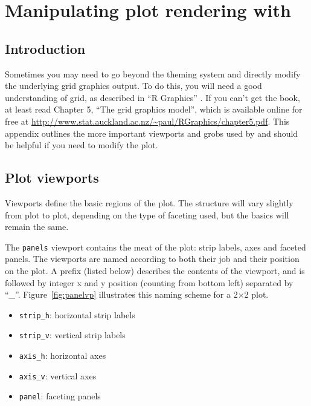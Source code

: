 

% 


\chapter{Manipulating plot rendering with }
\label{cha:grid}

\section{Introduction}

Sometimes you may need to go beyond the theming system and directly modify the underlying grid graphics output.  To do this, you will need a good understanding of grid, as described in ``R Graphics'' \citep{murrell:2005}.  If you can't get the book, at least read Chapter 5, ``The grid graphics model'', which is available online for free at  \url{http://www.stat.auckland.ac.nz/~paul/RGraphics/chapter5.pdf}.  This appendix outlines the more important viewports and grobs used by \ggplot and should be helpful if you need to modify the plot.

\section{Plot viewports}
\label{sec:plot-viewports}

Viewports define the basic regions of the plot.  The structure will vary slightly from plot to plot, depending on the type of faceting used, but the basics will remain the same. 

The {\tt panels} viewport contains the meat of the plot: strip labels, axes and faceted panels.  The viewports are named according to both their job and their position on the plot.  A prefix (listed below) describes the contents of the viewport, and is followed by integer x and y position (counting from bottom left) separated by ``\_''.  Figure~\ref{fig:panelvp} illustrates this naming scheme for a 2$\times$2 plot.

\begin{itemize}
  \item {\tt strip\_h}: horizontal strip labels
  \item {\tt strip\_v}: vertical strip labels
  \item {\tt axis\_h}: horizontal axes
  \item {\tt axis\_v}: vertical axes
  \item {\tt panel}: faceting panels
\end{itemize}

